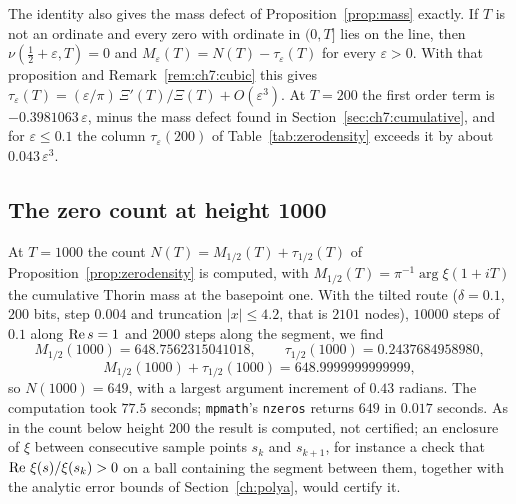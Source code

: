 The identity also gives the mass defect of Proposition~\ref{prop:mass} exactly. If $T$ is not an ordinate and every zero with ordinate in $(0,T]$ lies on the line, then $\nu(\tfrac12+\varepsilon,T)=0$ and $M_\varepsilon(T)=N(T)-\tau_\varepsilon(T)$ for every $\varepsilon>0$. With that proposition and Remark~\ref{rem:ch7:cubic} this gives $\tau_\varepsilon(T)=(\varepsilon/\pi)\,\Xi'(T)/\Xi(T)+O(\varepsilon^3)$. At $T=200$ the first order term is $-0.3981063\,\varepsilon$, minus the mass defect found in Section~\ref{sec:ch7:cumulative}, and for $\varepsilon\le0.1$ the column $\tau_\varepsilon(200)$ of Table~\ref{tab:zerodensity} exceeds it by about $0.043\,\varepsilon^3$.

\subsection{The zero count at height 1000}\label{sec:ch5:count}

At $T=1000$ the count $N(T)=M_{1/2}(T)+\tau_{1/2}(T)$ of Proposition~\ref{prop:zerodensity} is computed, with $M_{1/2}(T)=\pi^{-1}\arg\xi(1+iT)$ the cumulative Thorin mass at the basepoint one. With the tilted route ($\delta=0.1$, $200$ bits, step $0.004$ and truncation $|x|\le4.2$, that is $2101$ nodes), $10000$ steps of $0.1$ along $\operatorname{Re} s=1$ and $2000$ steps along the segment, we find
\[
M_{1/2}(1000)=648.7562315041018,\qquad \tau_{1/2}(1000)=0.2437684958980,
\]
\[
M_{1/2}(1000)+\tau_{1/2}(1000)=648.9999999999999,
\]
so $N(1000)=649$, with a largest argument increment of $0.43$ radians. The computation took $77.5$ seconds; \texttt{mpmath}'s \texttt{nzeros} returns $649$ in $0.017$ seconds. As in the count below height $200$ the result is computed, not certified; an enclosure of $\xi$ between consecutive sample points $s_k$ and $s_{k+1}$, for instance a check that $\operatorname{Re}\,\xi(s)/\xi(s_k)>0$ on a ball containing the segment between them, together with the analytic error bounds of Section~\ref{ch:polya}, would certify it.
